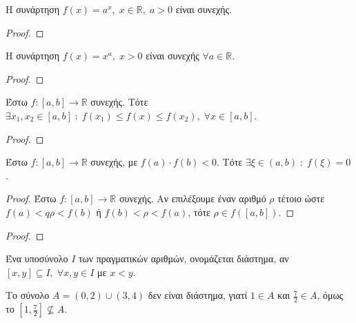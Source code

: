 \documentclass[main.tex]{subfiles}
\begin{document}
\begin{prop}
    Η συνάρτηση $ f(x) = a^{x}, \; x \in \mathbb{R}, \; a>0 $ είναι συνεχής.
\end{prop}

\begin{proof}
    
\end{proof}

\begin{prop}
    Η συνάρτηση $ f(x) = x^{a}, \; x>0 $ είναι συνεχής $ \forall a \in \mathbb{R} $.
\end{prop}

\begin{proof}
    
\end{proof}

\begin{thm}
    Έστω $ f \colon [a,b] \to \mathbb{R} $ συνεχής. Τότε $ \exists x_{1}, x_{2} \in 
    [a,b] \; : \; f(x_{1}) \leq f(x) \leq f(x_{2}), \; \forall x \in [a,b]$.
\end{thm}

\begin{proof}
    
\end{proof}

\begin{thm}[Bolzano]
    Έστω $ f \colon [a,b] \to \mathbb{R} $ συνεχής, με $ f(a) \cdot f(b) <0 $. 
    Τότε $ \exists \xi \in (a,b) \; : \; f(\xi) = 0 $.
\end{thm}

\begin{proof}
    Έστω $ f \colon [a,b] \to \mathbb{R} $ συνεχής. Αν επιλέξουμε έναν αριθμό $ \rho $ 
    τέτοιο ώστε $ f(a) < q \rho < f(b) $ ή $ f(b) < \rho < f(a) $, τότε $ \rho \in 
    f([a,b]) $.
\end{proof}

\begin{proof}
    
\end{proof}

\begin{dfn}
    Ένα υποσύνολο $I$ των πραγματικών αριθμών, ονομάζεται διάστημα, αν 
    $ [x,y] \subseteq I, \; \forall x,y \in I $ με $ x<y $.
\end{dfn}

\begin{example}
    Το σύνολο $ A = (0,2) \cup (3,4) $ δεν είναι διάστημα, γιατί $ 1 \in A $ και 
    $ \frac{7}{2} \in A $, όμως το $ \left[1, \frac{7}{2}\right] \not\subseteq A $.
\end{example}
\end{document}
